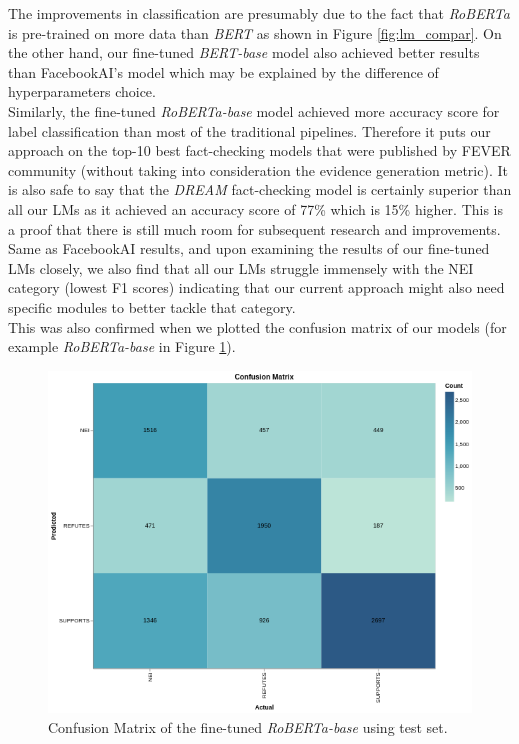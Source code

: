 \documentclass[10pt, english]{report}
\begin{document}
The improvements in classification are presumably due to the fact that \textit{RoBERTa} is pre-trained on more data than \textit{BERT} as shown in Figure \ref{fig:lm_compar}. On the other hand, our fine-tuned \textit{BERT-base} model also achieved better results than FacebookAI's model which may be explained by the difference of hyperparameters choice.\\

Similarly, the fine-tuned \textit{RoBERTa-base} model achieved more accuracy score for label classification than most of the traditional pipelines. Therefore it puts our approach on the top-10 best fact-checking models that were published by FEVER community\cite{thorne2018fact} (without taking into consideration the evidence generation metric). It is also safe to say that the \textit{DREAM} fact-checking model is certainly superior than all our LMs as it achieved an accuracy score of 77\% which is 15\% higher. This is a proof that there is still much room for subsequent research and improvements.\\

Same as FacebookAI results\cite{lee2020language}, and upon examining the results of our fine-tuned LMs closely, we also find that all our LMs struggle immensely with the NEI category (lowest F1 scores) indicating that our current approach might also need specific modules to better tackle that category.\\
This was also confirmed when we plotted the confusion matrix of our models (for example \textit{RoBERTa-base} in Figure \ref{fig:confusion_matrix_roberta}).

\begin{figure}[htp]
    \centering
    \includegraphics[scale=0.45]{img/confusion_matrix_roberta.png}
    \caption[Comparison]{Confusion Matrix of the fine-tuned \textit{RoBERTa-base} using test set.}
    \label{fig:confusion_matrix_roberta}
\end{figure}
\end{document}
